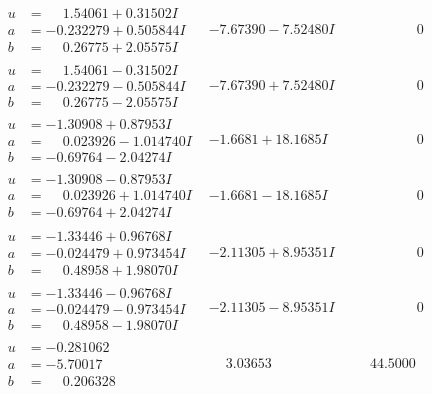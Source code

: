 \documentclass[1p]{elsarticle_modified}
\theoremstyle{definition}
\begin{document}
$$\begin{array}{c|c|c}
\begin{aligned}
u &= \phantom{-}1.54061 + 0.31502 I \\
a &= -0.232279 + 0.505844 I \\
b &= \phantom{-}0.26775 + 2.05575 I\end{aligned}
 & -7.67390 - 7.52480 I & \phantom{-0.000000 } 0 \\ \hline\begin{aligned}
u &= \phantom{-}1.54061 - 0.31502 I \\
a &= -0.232279 - 0.505844 I \\
b &= \phantom{-}0.26775 - 2.05575 I\end{aligned}
 & -7.67390 + 7.52480 I & \phantom{-0.000000 } 0 \\ \hline\begin{aligned}
u &= -1.30908 + 0.87953 I \\
a &= \phantom{-}0.023926 - 1.014740 I \\
b &= -0.69764 - 2.04274 I\end{aligned}
 & -1.6681 + 18.1685 I & \phantom{-0.000000 } 0 \\ \hline\begin{aligned}
u &= -1.30908 - 0.87953 I \\
a &= \phantom{-}0.023926 + 1.014740 I \\
b &= -0.69764 + 2.04274 I\end{aligned}
 & -1.6681 - 18.1685 I & \phantom{-0.000000 } 0 \\ \hline\begin{aligned}
u &= -1.33446 + 0.96768 I \\
a &= -0.024479 + 0.973454 I \\
b &= \phantom{-}0.48958 + 1.98070 I\end{aligned}
 & -2.11305 + 8.95351 I & \phantom{-0.000000 } 0 \\ \hline\begin{aligned}
u &= -1.33446 - 0.96768 I \\
a &= -0.024479 - 0.973454 I \\
b &= \phantom{-}0.48958 - 1.98070 I\end{aligned}
 & -2.11305 - 8.95351 I & \phantom{-0.000000 } 0 \\ \hline\begin{aligned}
u &= -0.281062\phantom{ +0.000000I} \\
a &= -5.70017\phantom{ +0.000000I} \\
b &= \phantom{-}0.206328\phantom{ +0.000000I}\end{aligned}
 & \phantom{-}3.03653\phantom{ +0.000000I} & \phantom{-}44.5000\phantom{ +0.000000I} \\ \hline\begin{aligned}

\end{aligned}
\end{array}$$
\end{document}
